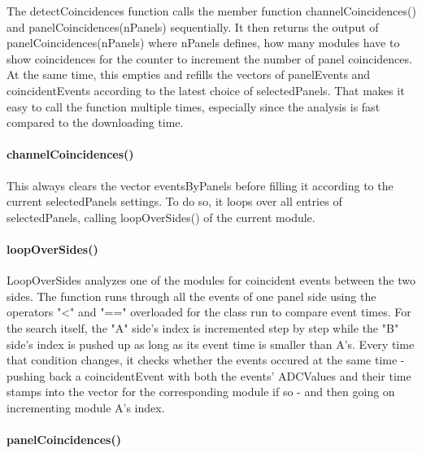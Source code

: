     The detectCoincidences function calls the member function channelCoincidences() and panelCoincidences(nPanels) sequentially. It then returns the output of panelCoincidences(nPanels) where nPanels defines, how many modules have to show coincidences for the counter to increment the number of panel coincidences. At the same time, this empties and refills the vectors of panelEvents and coincidentEvents according to the latest choice of selectedPanels. That makes it easy to call the function multiple times, especially since the analysis is fast compared to the downloading time.
    
    \paragraph{channelCoincidences()}
    \label{ch:Analysis software:sec:methods of the class run:subsec:channelCoincidences()}
    This always clears the vector eventsByPanels before filling it according to the current selectedPanels settings. To do so, it loops over all entries of selectedPanels, calling loopOverSides() of the current module.
    
    \paragraph{loopOverSides()}
    \label{ch:Analysis software:sec:methods of the class run:subsec:loopOverSides()}
    
    LoopOverSides analyzes one of the modules for coincident events between the two sides. The function runs through all the events of one panel side using the operators "<" and "==" overloaded for the class run to compare event times. For the search itself, the "A" side's index is incremented step by step while the "B" side's index is pushed up as long as its event time is smaller than A's. Every time that condition changes, it checks whether the events occured at the same time - pushing back a coincidentEvent with both the events' ADCValues and their time stamps into the vector for the corresponding module if so - and then going on incrementing module A's index.
    
    \paragraph{panelCoincidences()}
    \label{ch:Analysis software:sec:methods of the class run:subsec:panelCoincidences()}

